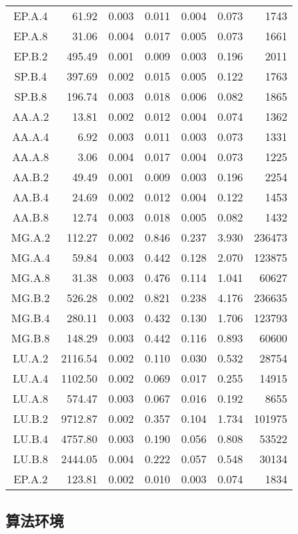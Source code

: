 \begin{ThreePartTable}
\begin{longtable}[c]{c*{6}{r}}
EP.A.4 & 61.92 & 0.003 & 0.011 & 0.004 & 0.073 & 1743 \\
EP.A.8 & 31.06 & 0.004 & 0.017 & 0.005 & 0.073 & 1661 \\
EP.B.2 & 495.49 & 0.001 & 0.009 & 0.003 & 0.196 & 2011 \\
SP.B.4 & 397.69 & 0.002 & 0.015 & 0.005 & 0.122 & 1763 \\
SP.B.8 & 196.74 & 0.003 & 0.018 & 0.006 & 0.082 & 1865 \\
AA.A.2 & 13.81 & 0.002 & 0.012 & 0.004 & 0.074 & 1362 \\
AA.A.4 & 6.92 & 0.003 & 0.011 & 0.003 & 0.073 & 1331 \\
AA.A.8 & 3.06 & 0.004 & 0.017 & 0.004 & 0.073 & 1225 \\
AA.B.2 & 49.49 & 0.001 & 0.009 & 0.003 & 0.196 & 2254 \\
AA.B.4 & 24.69 & 0.002 & 0.012 & 0.004 & 0.122 & 1453 \\
AA.B.8 & 12.74 & 0.003 & 0.018 & 0.005 & 0.082 & 1432 \\
MG.A.2 & 112.27 & 0.002 & 0.846 & 0.237 & 3.930 & 236473 \\
MG.A.4 & 59.84 & 0.003 & 0.442 & 0.128 & 2.070 & 123875 \\
MG.A.8 & 31.38 & 0.003 & 0.476 & 0.114 & 1.041 & 60627 \\
MG.B.2 & 526.28 & 0.002 & 0.821 & 0.238 & 4.176 & 236635 \\
MG.B.4 & 280.11 & 0.003 & 0.432 & 0.130 & 1.706 & 123793 \\
MG.B.8 & 148.29 & 0.003 & 0.442 & 0.116 & 0.893 & 60600 \\
LU.A.2 & 2116.54 & 0.002 & 0.110 & 0.030 & 0.532 & 28754 \\
LU.A.4 & 1102.50 & 0.002 & 0.069 & 0.017 & 0.255 & 14915 \\
LU.A.8 & 574.47 & 0.003 & 0.067 & 0.016 & 0.192 & 8655 \\
LU.B.2 & 9712.87 & 0.002 & 0.357 & 0.104 & 1.734 & 101975 \\
LU.B.4 & 4757.80 & 0.003 & 0.190 & 0.056 & 0.808 & 53522 \\
LU.B.8 & 2444.05 & 0.004 & 0.222 & 0.057 & 0.548 & 30134 \\
EP.A.2 & 123.81 & 0.002 & 0.010 & 0.003 & 0.074 & 1834 \\
    \bottomrule
  \end{longtable}
\end{ThreePartTable}



\subsection{算法环境}

